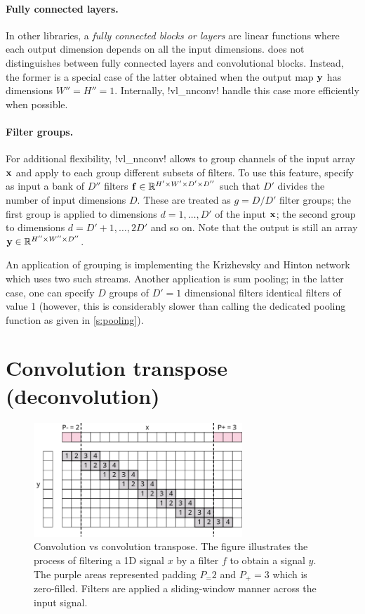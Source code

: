 \paragraph{Fully connected layers.} In other libraries, a \emph{fully connected blocks or layers} are linear functions where each output dimension depends on all the input dimensions. \matconvnet does not distinguishes between fully connected layers and convolutional blocks. Instead, the former is a special case of the latter obtained when the output map $\mathbf{y}$ has dimensions $W''=H''=1$. Internally, !vl_nnconv! handle this case more efficiently when possible.

\paragraph{Filter groups.} For additional flexibility, !vl_nnconv! allows to group channels of the input array $\mathbf{x}$ and apply to each group different subsets of filters. To use this feature, specify as input a bank  of $D''$ filters $\mathbf{f}\in\mathbb{R}^{H'\times W'\times D'\times D''}$ such that $D'$ divides the number of input dimensions $D$. These are treated as $g=D/D'$ filter groups; the first group is applied to dimensions $d=1,\dots,D'$ of the input $\mathbf{x}$; the second group to dimensions $d=D'+1,\dots,2D'$ and so on. Note that the output is still an array $\mathbf{y}\in\mathbb{R}^{H''\times W''\times D''}$.

An application of grouping is implementing the Krizhevsky and Hinton network~\cite{krizhevsky12imagenet} which uses two such streams. Another application is sum pooling; in the latter case, one can specify $D$ groups of $D'=1$ dimensional filters identical filters of value 1 (however, this is considerably slower than calling the dedicated pooling function as given in \autoref{s:pooling}).

\section{Convolution transpose (deconvolution)}\label{s:convt}

\begin{figure}[t]
	\centering
	\includegraphics[width=0.7\textwidth]{figures/svg/convt}
	\caption{Convolution vs convolution transpose. The figure illustrates the process of filtering a 1D signal $x$ by a filter $f$ to obtain a signal $y$. The purple areas represented padding $P_=2$ and $P_+=3$ which is zero-filled. Filters are applied a sliding-window manner across the input signal.}\label{f:convt}
\end{figure}

